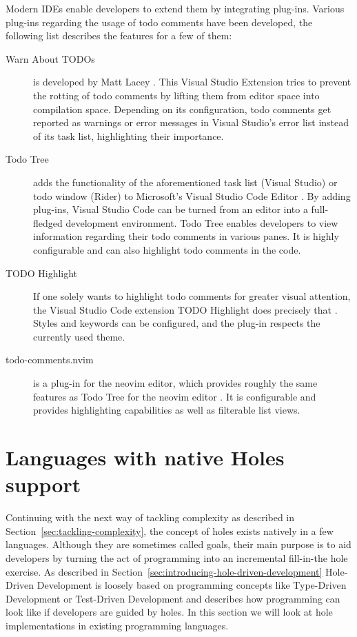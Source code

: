 Modern IDEs enable developers to extend them by integrating plug-ins.
Various plug-ins regarding the usage of todo comments have been developed, the following list describes the features for a few of them:
\begin{description}
  \item[Warn About TODOs] is developed by Matt Lacey \cite{lacey_warn_2023}. This Visual Studio Extension tries to prevent the rotting of todo comments by lifting them from editor space into compilation space. Depending on its configuration, todo comments get reported as warnings or error messages in Visual Studio's error list instead of its task list, highlighting their importance.
  \item[Todo Tree] adds the functionality of the aforementioned task list (Visual Studio) or todo window (Rider) to Microsoft's Visual Studio Code Editor \cite{scott_todo_2023}. By adding plug-ins, Visual Studio Code can be turned from an editor into a full-fledged development environment. Todo Tree enables developers to view information regarding their todo comments in various panes. It is highly configurable and can also highlight todo comments in the code.
  \item[TODO Highlight] If one solely wants to highlight todo comments for greater visual attention, the Visual Studio Code extension TODO Highlight does precisely that \cite{wayou_vscode_2023}. Styles and keywords can be configured, and the plug-in respects the currently used theme.
  \item[todo-comments.nvim] is a plug-in for the neovim editor, which provides roughly the same features as Todo Tree for the neovim editor \cite{lemaitre_todo_2023}. It is configurable and provides highlighting capabilities as well as filterable list views.
\end{description}


\section{Languages with native Holes support}
\label{sec:languages-with-native-holes-support}
Continuing with the next way of tackling complexity as described in Section~\ref{sec:tackling-complexity}, the concept of holes exists natively in a few languages.
Although they are sometimes called goals, their main purpose is to aid developers by turning the act of programming into an incremental fill-in-the hole exercise.
As described in Section~\ref{sec:introducing-hole-driven-development} Hole-Driven Development is loosely based on programming concepts like Type-Driven Development \cite{brady_type-driven_2017} or Test-Driven Development \cite{mccracken_digital_1957} and describes how programming can look like if developers are guided by holes.
In this section we will look at hole implementations in existing programming languages.

